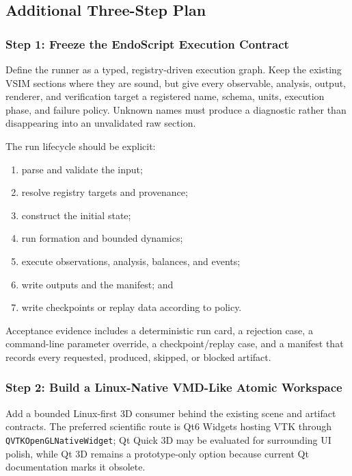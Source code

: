 \documentclass[11pt,a4paper]{article}
\begin{document}
\subsection{Additional Three-Step Plan}

\subsubsection{Step 1: Freeze the EndoScript Execution Contract}

Define the runner as a typed, registry-driven execution graph.  Keep the
existing VSIM sections where they are sound, but give every observable,
analysis, output, renderer, and verification target a registered name, schema,
units, execution phase, and failure policy.  Unknown names must produce a
diagnostic rather than disappearing into an unvalidated raw section.

The run lifecycle should be explicit:

\begin{enumerate}
  \item parse and validate the input;
  \item resolve registry targets and provenance;
  \item construct the initial state;
  \item run formation and bounded dynamics;
  \item execute observations, analysis, balances, and events;
  \item write outputs and the manifest; and
  \item write checkpoints or replay data according to policy.
\end{enumerate}

Acceptance evidence includes a deterministic run card, a rejection
case, a command-line parameter override, a checkpoint/replay case, and a
manifest that records every requested, produced, skipped, or blocked artifact.

\subsubsection{Step 2: Build a Linux-Native VMD-Like Atomic Workspace}

Add a bounded Linux-first 3D consumer behind the existing scene and artifact
contracts.  The preferred scientific route is Qt6 Widgets hosting VTK through
\texttt{QVTKOpenGLNativeWidget}; Qt Quick 3D may be evaluated for surrounding
UI polish, while Qt 3D remains a prototype-only option because current Qt
documentation marks it obsolete.
\end{document}
